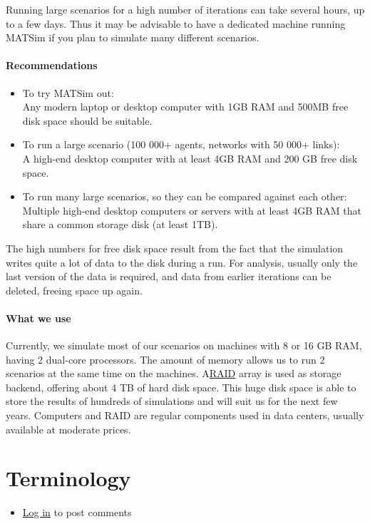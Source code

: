 \documentclass[a4paper,11pt]{report}
\begin{document}
Running large scenarios for  a high number of iterations can take several hours, up to a few days.  Thus it may be advisable to have a dedicated machine running MATSim if  you plan to simulate many different scenarios.

\subsubsection{Recommendations}
\begin{itemize}
	\item To try MATSim out:
\\Any modern laptop or desktop computer with 1GB RAM and 500MB free disk space should be suitable.
	\item To run a large scenario (100 000+ agents, networks with 50 000+ links): 
\\A high-end desktop computer with at least 4GB RAM and 200 GB free disk space.
	\item To run many large scenarios, so they can be compared against each other: 
\\Multiple high-end desktop computers or servers with at least 4GB RAM that share a common storage disk (at least 1TB).
\end{itemize}

The  high numbers for free disk space result from the fact that the  simulation writes quite a lot of data to the disk during a run. For  analysis, usually only the last version of the data is required, and  data from earlier iterations can be deleted, freeing space up again.

\subsubsection{What we use}

Currently,  we simulate most of our scenarios on machines with 8 or 16 GB RAM,  having 2 dual-core processors. The amount of memory allows us to run 2  scenarios at the same time on the machines. A\href{http://en.wikipedia.org/wiki/RAID}{RAID}  array is used as storage backend, offering about 4 TB of hard disk  space. This huge disk space is able to store the results of hundreds of  simulations and will suit us for the next few years. Computers and RAID  are regular components used in data centers, usually available at  moderate prices.

\chapter{Terminology}
\begin{itemize}
	\item \href{http://www.matsim.org/user/login?destination=comment/reply/509%23comment-form}{Log in} to post comments
\end{itemize}
\end{document}
